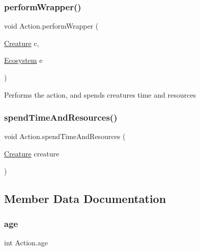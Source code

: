 \mbox{\label{class_action_a1f677dca95b97037f8e0e4bb6b225cb8}} 
\subsubsection{\texorpdfstring{perform\+Wrapper()}{performWrapper()}}
{\footnotesize\ttfamily void Action.\+perform\+Wrapper (\begin{DoxyParamCaption}\item[{\mbox{\hyperlink{class_creature}{Creature}}}]{c,  }\item[{\mbox{\hyperlink{class_ecosystem}{Ecosystem}}}]{e }\end{DoxyParamCaption})}



Performs the action, and spends creatures time and resources 

\mbox{\label{class_action_a4a96d3be0975ce16929ff25f04668189}} 
\subsubsection{\texorpdfstring{spend\+Time\+And\+Resources()}{spendTimeAndResources()}}
{\footnotesize\ttfamily void Action.\+spend\+Time\+And\+Resources (\begin{DoxyParamCaption}\item[{\mbox{\hyperlink{class_creature}{Creature}}}]{creature }\end{DoxyParamCaption})}



\subsection{Member Data Documentation}
\mbox{\label{class_action_a04d8b5a2d29dd0b215af21be1a644ac0}} 
\subsubsection{\texorpdfstring{age}{age}}
{\footnotesize\ttfamily int Action.\+age}

